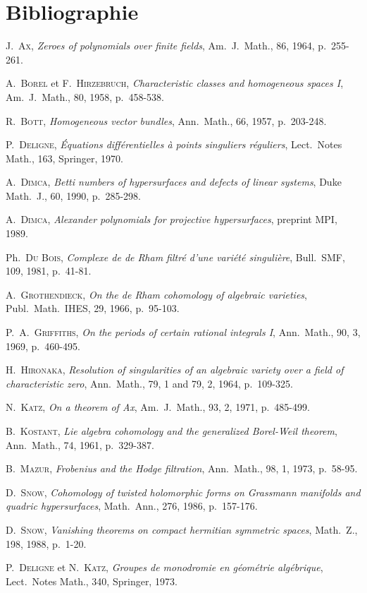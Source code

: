 \documentclass[12pt,a4paper]{article}
\theoremstyle{plain}
\theoremstyle{definition}
\begin{document}
\section*{Bibliographie}

\begin{enumerate}[label={[\arabic*]}, leftmargin=2em, itemsep=2pt]
\item J.\ \textsc{Ax}, \textit{Zeroes of polynomials over finite fields}, Am.\ J.\ Math., 86, 1964, p.~255-261.
\item A.\ \textsc{Borel} et F.\ \textsc{Hirzebruch}, \textit{Characteristic classes and homogeneous spaces I}, Am.\ J.\ Math., 80, 1958, p.~458-538.
\item R.\ \textsc{Bott}, \textit{Homogeneous vector bundles}, Ann.\ Math., 66, 1957, p.~203-248.
\item P.\ \textsc{Deligne}, \textit{Équations différentielles à points singuliers réguliers}, Lect.\ Notes Math., 163, Springer, 1970.
\item A.\ \textsc{Dimca}, \textit{Betti numbers of hypersurfaces and defects of linear systems}, Duke Math.\ J., 60, 1990, p.~285-298.
\item A.\ \textsc{Dimca}, \textit{Alexander polynomials for projective hypersurfaces}, preprint MPI, 1989.
\item Ph.\ \textsc{Du Bois}, \textit{Complexe de de Rham filtré d'une variété singulière}, Bull.\ SMF, 109, 1981, p.~41-81.
\item A.\ \textsc{Grothendieck}, \textit{On the de Rham cohomology of algebraic varieties}, Publ.\ Math.\ IHES, 29, 1966, p.~95-103.
\item P.\ A.\ \textsc{Griffiths}, \textit{On the periods of certain rational integrals I}, Ann.\ Math., 90, 3, 1969, p.~460-495.
\item H.\ \textsc{Hironaka}, \textit{Resolution of singularities of an algebraic variety over a field of characteristic zero}, Ann.\ Math., 79, 1 and 79, 2, 1964, p.~109-325.
\item N.\ \textsc{Katz}, \textit{On a theorem of Ax}, Am.\ J.\ Math., 93, 2, 1971, p.~485-499.
\item B.\ \textsc{Kostant}, \textit{Lie algebra cohomology and the generalized Borel-Weil theorem}, Ann.\ Math., 74, 1961, p.~329-387.
\item B.\ \textsc{Mazur}, \textit{Frobenius and the Hodge filtration}, Ann.\ Math., 98, 1, 1973, p.~58-95.
\item D.\ \textsc{Snow}, \textit{Cohomology of twisted holomorphic forms on Grassmann manifolds and quadric hypersurfaces}, Math.\ Ann., 276, 1986, p.~157-176.
\item D.\ \textsc{Snow}, \textit{Vanishing theorems on compact hermitian symmetric spaces}, Math.\ Z., 198, 1988, p.~1-20.
\item[{[SGA 7 (t.~2)]}] P.\ \textsc{Deligne} et N.\ \textsc{Katz}, \textit{Groupes de monodromie en géométrie algébrique}, Lect.\ Notes Math., 340, Springer, 1973.
\end{enumerate}
\end{document}
